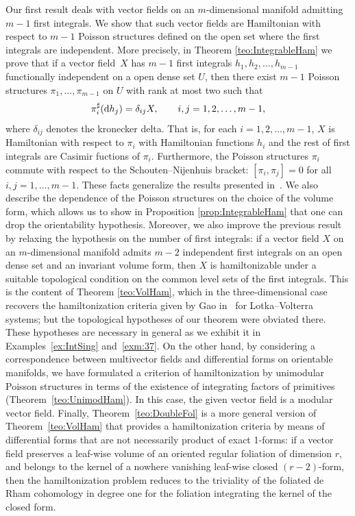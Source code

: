 \documentclass[pdftex]{sigma}%
\newcommand{\dd}{{\rm d}}
\numberwithin{equation}{section}
\begin{document}
Our first result deals with vector fields on an $m$-dimensional manifold admitting $m-1$ first integrals. We show that such vector fields are Hamiltonian with respect to $m-1$ Poisson structures defined on the open set where the first integrals are independent.
More precisely, in Theorem \ref{teo:IntegrableHam} we prove that if a vector field~$X$ has $m-1$ first integrals $h_1,h_2,\dots, h_{m-1}$ functionally independent on a open dense set $U$, then there exist $m-1$ Poisson structures $\pi_1,\dots, \pi_{m-1}$ on $U$ with rank at most two such that
 \begin{equation*}
 \pi_i^\sharp(\dd h_j)=\delta_{ij}X,\qquad
 i,j=1,2,\dots, m-1,
 \end{equation*}
where $\delta_{ij}$ denotes the kronecker delta. That is, for each $i=1,2,\dots, m-1$, $X$ is Hamiltonian with respect to $\pi_i$ with Hamiltonian functions $h_i$ and the rest of first integrals are Casimir fuctions of $\pi_i$. Furthermore, the Poisson structures $\pi_{i}$ commute with respect to the Schouten--Nijenhuis bracket: $[\pi_i,\pi_j]=0$ for all $i,j=1,\dots,m-1$. These facts generalize the results presented in~\cite{Gumral-Nut}. We also describe the dependence of the Poisson structures on the choice of the volume form, which allows us to show in Proposition \ref{prop:IntegrableHam} that one can drop the orientability hypothesis. Moreover, we also improve the previous result by relaxing the hypothesis on the number of first integrals: if a vector field $X$ on an $m$-dimensional manifold admits $m-2$ independent first integrals on an open dense set and an invariant volume form, then $X$ is hamiltonizable under a suitable topological condition on the common level sets of the first integrals. This is the content of Theorem \ref{teo:VolHam}, which in the three-dimensional case recovers the hamiltonization criteria given by Gao in~\cite{Gao-2000} for Lotka--Volterra systems; but the topological hypotheses of our theorem were obviated there. These hypotheses are necessary in general as we exhibit it in Examples~\ref{ex:IntSing} and~\ref{exm:37}. On the other hand, by considering a correspondence between multivector fields and differential forms on orientable manifolds, we have formulated a criterion of hamiltonization by unimodular Poisson structures in terms of the existence of integrating factors of primitives (Theorem~\ref{teo:UnimodHam}). In this case, the given vector field is a modular vector field. Finally, Theorem~\ref{teo:DoubleFol} is a more general version of Theorem~\ref{teo:VolHam} that provides a hamiltonization criteria by means of differential forms that are not necessarily product of exact 1-forms: if a vector field preserves a leaf-wise volume of an oriented regular foliation of dimension $r$, and belongs to the kernel of a nowhere vanishing leaf-wise closed $(r-2)$-form, then the hamiltonization problem reduces to the triviality of the foliated de Rham cohomology in degree one for the foliation integrating the kernel of the closed form.
\end{document}

